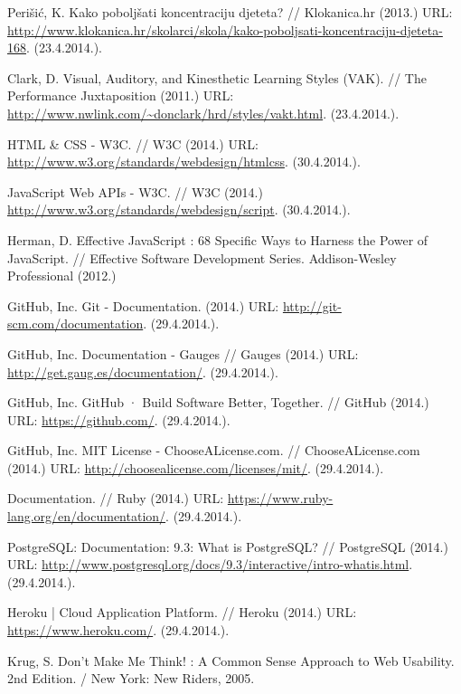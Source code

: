 \documentclass[11pt]{scrreprt}
\begin{document}
\begin{thebibliography}{99}

  \raggedright

   Perišić, K. Kako poboljšati koncentraciju djeteta? //
    Klokanica.hr (2013.) URL:
    \url{http://www.klokanica.hr/skolarci/skola/kako-poboljsati-koncentraciju-djeteta-168}.
    (23.4.2014.).

   Clark, D. Visual, Auditory, and Kinesthetic Learning Styles
    (VAK). // The Performance Juxtaposition (2011.) URL:
    \url{http://www.nwlink.com/~donclark/hrd/styles/vakt.html}. (23.4.2014.).

   HTML \& CSS - W3C. // W3C (2014.) URL:
    \url{http://www.w3.org/standards/webdesign/htmlcss}. (30.4.2014.).

   JavaScript Web APIs - W3C. // W3C (2014.)
    \url{http://www.w3.org/standards/webdesign/script}. (30.4.2014.).

   Herman, D. Effective JavaScript : 68 Specific Ways to
    Harness the Power of JavaScript. // Effective Software Development Series.
    Addison-Wesley Professional (2012.)

   GitHub, Inc. Git - Documentation. (2014.) URL:
    \url{http://git-scm.com/documentation}. (29.4.2014.).

   GitHub, Inc. Documentation - Gauges // Gauges (2014.) URL:
    \url{http://get.gaug.es/documentation/}. (29.4.2014.).

   GitHub, Inc. GitHub · Build Software Better, Together. //
    GitHub (2014.) URL: \url{https://github.com/}. (29.4.2014.).

   GitHub, Inc. MIT License - ChooseALicense.com. //
    ChooseALicense.com (2014.) URL:
    \url{http://choosealicense.com/licenses/mit/}. (29.4.2014.).

   Documentation. // Ruby (2014.) URL:
    \url{https://www.ruby-lang.org/en/documentation/}. (29.4.2014.).

   PostgreSQL: Documentation: 9.3:  What is PostgreSQL? //
    PostgreSQL (2014.) URL:
    \url{http://www.postgresql.org/docs/9.3/interactive/intro-whatis.html}.
    (29.4.2014.).

   Heroku | Cloud Application Platform. // Heroku (2014.) URL:
    \url{https://www.heroku.com/}. (29.4.2014.).

   Krug, S. Don’t Make Me Think! : A Common Sense Approach to
    Web Usability. 2nd Edition. / New York: New Riders, 2005.


\end{thebibliography}
\end{document}
